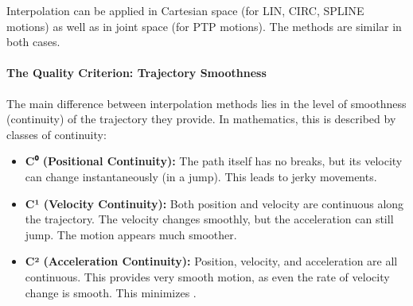 Interpolation can be applied in Cartesian space (for LIN, CIRC, SPLINE motions) as well as in joint space (for PTP motions). The methods are similar in both cases.

\paragraph{The Quality Criterion: Trajectory Smoothness}
The main difference between interpolation methods lies in the level of smoothness (continuity) of the trajectory they provide. In mathematics, this is described by classes of continuity:
\begin{itemize}
    \item \textbf{C⁰ (Positional Continuity):} The path itself has no breaks, but its velocity can change instantaneously (in a jump). This leads to jerky movements.
    \item \textbf{C¹ (Velocity Continuity):} Both position and velocity are continuous along the trajectory. The velocity changes smoothly, but the acceleration can still jump. The motion appears much smoother.
    \item \textbf{C² (Acceleration Continuity):} Position, velocity, and acceleration are all continuous. This provides very smooth motion, as even the rate of velocity change is smooth. This minimizes .
\end{itemize}

